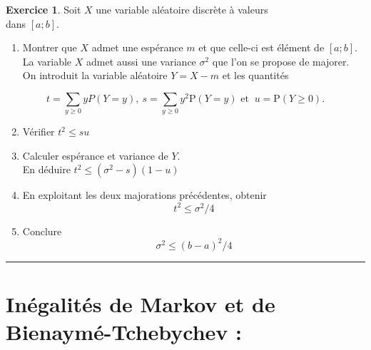 \documentclass[a4paper,11pt]{article}
\theoremstyle{definition}
\newtheorem{exo}{Exercice} %
\begin{document}
\begin{minipage}{1\linewidth}
\begin{minipage}[t]{0.48\linewidth}
\begin{exo}
			Soit $X$ une variable aléatoire discrète à valeurs \\
			dans $[a ; b]$.
			\begin{enumerate}
				\item  Montrer que $X$ admet une espérance $m$ et que celle-ci est élément de $[a ; b]$. La variable $X$ admet aussi une variance $\sigma^{2}$ que l'on se propose de majorer. On introduit la variable aléatoire $Y=X-m$ et les quantités\end{enumerate}
$$
t=\sum_{y \geq 0} y P(Y=y),\  s=\sum_{y \geq 0} y^{2} \mathrm{P}(Y=y) \text { et }  \ u=\mathrm{P}(Y \geq 0) .
$$			\begin{enumerate}\setcounter{enumi}{1}
				\item Vérifier $t^{2} \leq s u$
				\item Calculer espérance et variance de $Y$.\\ 
				En déduire $t^{2} \leq\left(\sigma^{2}-s\right)(1-u)$
				\item En exploitant les deux majorations précédentes, obtenir
				$$
				t^{2} \leq \sigma^{2} / 4
				$$
				\item Conclure $$
				\sigma^{2} \leq(b-a)^{2} / 4
				$$
			\end{enumerate}
	

			\centering\rule{1\linewidth}{0.6pt}\end{exo}
		
		
\end{minipage}\end{minipage}\section*{Inégalités de Markov et de Bienaymé-Tchebychev :}\hfill\\%
\end{document}
